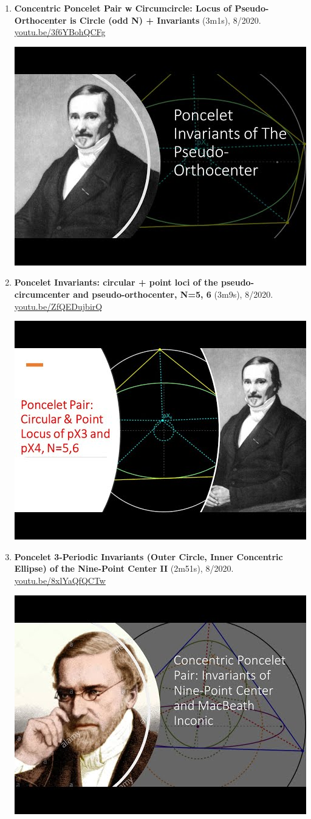 \documentclass[12pt]{article}
\begin{document}
\begin{enumerate}[resume]
% 
\item \textbf{Concentric Poncelet Pair w Circumcircle: Locus of Pseudo-Orthocenter is Circle (odd N) + Invariants} (3m1s), 8/2020. \href{https://youtu.be/3f6YBohQCFg}{\url{youtu.be/3f6YBohQCFg}}
\begin{center}\includegraphics[width=.5\textwidth]{pics/3f6YBohQCFg.jpg}\end{center}
% 
\item \textbf{Poncelet Invariants:
circular + point loci of the pseudo-circumcenter and pseudo-orthocenter, N=5, 6} (3m9s), 8/2020. \href{https://youtu.be/ZfQEDujbirQ}{\url{youtu.be/ZfQEDujbirQ}}
\begin{center}\includegraphics[width=.5\textwidth]{pics/ZfQEDujbirQ.jpg}\end{center}
% 
\item \textbf{Poncelet 3-Periodic Invariants (Outer Circle, Inner Concentric Ellipse) of the Nine-Point Center II} (2m51s), 8/2020. \href{https://youtu.be/8xlYaQfQCTw}{\url{youtu.be/8xlYaQfQCTw}}
\begin{center}\includegraphics[width=.5\textwidth]{pics/8xlYaQfQCTw.jpg}\end{center}

\end{enumerate}
\end{document}
